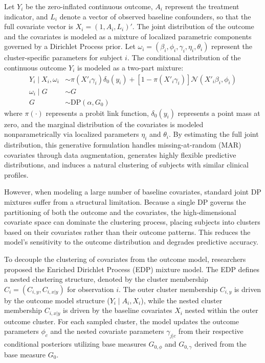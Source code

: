 \documentclass[11pt, a4paper]{article}
\begin{document}
Let $Y_i$ be the zero-inflated continuous outcome, $A_i$ represent the treatment indicator, and $L_i$ denote a vector of observed baseline confounders, so that the full covariate vector is $X_i = (1, A_i, L_i)'$.\cite{oganisian2020} The joint distribution of the outcome and the covariates is modeled as a mixture of localized parametric components governed by a Dirichlet Process prior.\cite{oganisian2020} Let $\omega_i = (\beta_i, \phi_i, \gamma_i, \eta_i, \theta_i)$ represent the cluster-specific parameters for subject $i$.\cite{oganisian2020} The conditional distribution of the continuous outcome $Y_i$ is modeled as a two-part mixture:
\begin{align}
Y_i \mid X_i, \omega_i & \sim \pi(X'_i \gamma_i) \delta_0(y_i) + \left[1 - \pi(X'_i \gamma_i)\right] \mathcal{N}(X'_i \beta_i, \phi_i) \\
\omega_i \mid G & \sim G \\
G & \sim \text{DP}(\alpha, G_0)
\end{align}
where $\pi(\cdot)$ represents a probit link function, $\delta_0(y_i)$ represents a point mass at zero, and the marginal distribution of the covariates is modeled nonparametrically via localized parameters $\eta_i$ and $\theta_i$.\cite{oganisian2020} By estimating the full joint distribution, this generative formulation handles missing-at-random (MAR) covariates through data augmentation, generates highly flexible predictive distributions, and induces a natural clustering of subjects with similar clinical profiles.\cite{oganisian2020, oganisianpkg}

However, when modeling a large number of baseline covariates, standard joint DP mixtures suffer from a structural limitation.\cite{wade2011} Because a single DP governs the partitioning of both the outcome and the covariates, the high-dimensional covariate space can dominate the clustering process, placing subjects into clusters based on their covariates rather than their outcome patterns.\cite{wade2011} This reduces the model's sensitivity to the outcome distribution and degrades predictive accuracy.\cite{wade2011}

To decouple the clustering of covariates from the outcome model, researchers proposed the Enriched Dirichlet Process (EDP) mixture model.\cite{oganisian2021, wade2011, wade2014} The EDP defines a nested clustering structure, denoted by the cluster membership $C_i = (C_{i, y}, C_{i, x|y})$ for observation $i$.\cite{wade2011} The outer cluster membership $C_{i, y}$ is driven by the outcome model structure ($Y_i \mid A_i, X_i$), while the nested cluster membership $C_{i, x|y}$ is driven by the baseline covariates $X_i$ nested within the outer outcome cluster.\cite{wade2011} For each sampled cluster, the model updates the outcome parameters $\phi_c$ and the nested covariate parameters $\gamma_{j|c}$ from their respective conditional posteriors utilizing base measures $G_{0, \phi}$ and $G_{0, \gamma}$ derived from the base measure $G_0$.\cite{wade2011}
\end{document}
